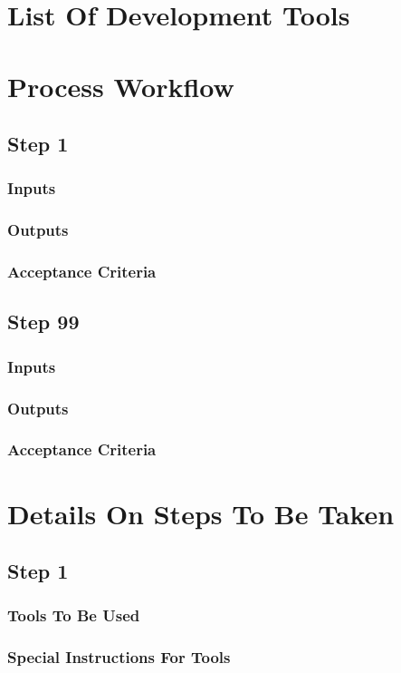 \documentclass[12pt, titlepage]{article}
\begin{document}
\section{List Of Development Tools}

\section{Process Workflow}
\subsection{Step 1}
\subsubsection*{Inputs}
\subsubsection*{Outputs}
\subsubsection*{Acceptance Criteria}

\subsection{Step 99}
\subsubsection*{Inputs}
\subsubsection*{Outputs}
\subsubsection*{Acceptance Criteria}


\section{Details On Steps To Be Taken}
\subsection{Step 1}
\subsubsection*{Tools To Be Used}
\subsubsection*{Special Instructions For Tools}
\end{document}

